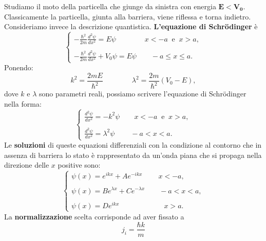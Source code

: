 \documentclass[a4paper,11pt,oneside]{book}
\begin{document}
Studiamo il moto della particella che giunge da sinistra con energia $\mathbf{E<V_0}$. Classicamente la particella, giunta alla barriera, viene riflessa e torna indietro.\\
Consideriamo invece la descrizione quantistica. \textbf{L'equazione di Schr\"{o}dinger} è
\begin{equation}
\begin{cases}
\displaystyle{-\frac{\hbar ^2}{2m}\frac{d^2 \psi}{d x^2}=E \psi \qquad \qquad x <-a \ \textrm{ e }\  x>a,}\\
\\
\displaystyle{-\frac{\hbar ^2}{2m}\frac{d^2 \psi}{d x^2}+V_0 \psi=E \psi \qquad -a  \leq x \leq a.}
\end{cases}
\end{equation}
Ponendo:
\begin{equation}
k^2= \frac{2mE}{\hbar ^2} \qquad \qquad \lambda ^2= \frac{2m}{\hbar ^2} \left( V_0 - E \right),
\end{equation}
dove $k$ e $\lambda $ sono parametri reali, possiamo scrivere l'equazione di Schr\"{o}dinger nella forma:
\begin{equation}
\begin{cases}
\displaystyle{\frac{d^2 \psi}{d x^2}= -k ^2 \psi \qquad  x <-a \ \textrm{ e }\  x>a,}\\
\\
\displaystyle{\frac{d^2 \psi}{d x^2}= \lambda ^2 \psi \qquad 	\ -a  < x < a.}
\end{cases}
\end{equation}
Le \textbf{soluzioni} di queste equazioni differenziali con la condizione al contorno che in assenza di barriera lo stato è rappresentato da un'onda piana che si propaga nella direzione delle $x$ positive sono:
\begin{equation}
\begin{cases}
\displaystyle{\psi (x) = e^{ikx}+Ae^{-ikx} \qquad \ x <-a,}\\
\\
\displaystyle{\psi (x) = Be^{\lambda x}+Ce^{-\lambda x} \qquad  -a< x <a,}\\
\\
\displaystyle{\psi (x) = De^{ikx} \qquad \qquad \qquad \ x >a.}
\end{cases}
\end{equation}
La \textbf{normalizzazione} scelta corrisponde ad aver fissato a
\begin{equation}
j_i= \frac{\hbar k}{m}
\end{equation}
\end{document}
